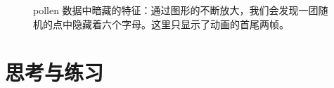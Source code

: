 \documentclass[
  b5paper,
  UTF8,twoside]{book}
\begin{document}
\begin{figure}

{\centering {}

}

\caption[pollen 数据中暗藏的特征]{pollen 数据中暗藏的特征：通过图形的不断放大，我们会发现一团随机的点中隐藏着六个字母。这里只显示了动画的首尾两帧。}\label{fig:animation-pollen}
\end{figure}





\hypertarget{ux601dux8003ux4e0eux7ec3ux4e60-4}{%
\section{思考与练习}\label{ux601dux8003ux4e0eux7ec3ux4e60-4}}
\end{document}
